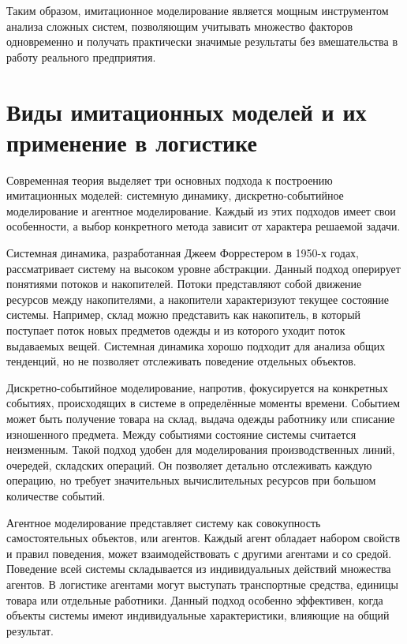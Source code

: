 \documentclass[14pt,a4paper]{extreport}
\begin{document}
\begin{singlespacing}
	Таким образом, имитационное моделирование является мощным инструментом анализа сложных систем, позволяющим учитывать множество факторов одновременно и получать практически значимые результаты без вмешательства в работу реального предприятия.
	
	\section{Виды имитационных моделей и их применение в логистике}
	
	Современная теория выделяет три основных подхода к построению имитационных моделей: системную динамику, дискретно-событийное моделирование и агентное моделирование. Каждый из этих подходов имеет свои особенности, а выбор конкретного метода зависит от характера решаемой задачи.
	
	Системная динамика, разработанная Джеем Форрестером в 1950-х годах, рассматривает систему на высоком уровне абстракции. Данный подход оперирует понятиями потоков и накопителей. Потоки представляют собой движение ресурсов между накопителями, а накопители характеризуют текущее состояние системы. Например, склад можно представить как накопитель, в который поступает поток новых предметов одежды и из которого уходит поток выдаваемых вещей. Системная динамика хорошо подходит для анализа общих тенденций, но не позволяет отслеживать поведение отдельных объектов.
	
	Дискретно-событийное моделирование, напротив, фокусируется на конкретных событиях, происходящих в системе в определённые моменты времени. Событием может быть получение товара на склад, выдача одежды работнику или списание изношенного предмета. Между событиями состояние системы считается неизменным. Такой подход удобен для моделирования производственных линий, очередей, складских операций. Он позволяет детально отслеживать каждую операцию, но требует значительных вычислительных ресурсов при большом количестве событий.
	
	Агентное моделирование представляет систему как совокупность самостоятельных объектов, или агентов. Каждый агент обладает набором свойств и правил поведения, может взаимодействовать с другими агентами и со средой. Поведение всей системы складывается из индивидуальных действий множества агентов. В логистике агентами могут выступать транспортные средства, единицы товара или отдельные работники. Данный подход особенно эффективен, когда объекты системы имеют индивидуальные характеристики, влияющие на общий результат.
	

\end{singlespacing}
\end{document}
